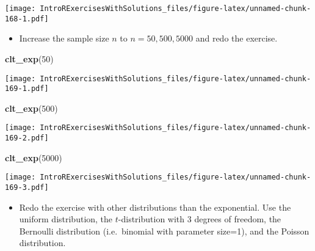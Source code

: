 \documentclass[]{article}
\newenvironment{Shaded}{\begin{snugshade}}{\end{snugshade}}
\newcommand{\KeywordTok}[1]{\textcolor[rgb]{0.13,0.29,0.53}{\textbf{#1}}}
\newcommand{\DecValTok}[1]{\textcolor[rgb]{0.00,0.00,0.81}{#1}}
\newcommand{\NormalTok}[1]{#1}
\providecommand{\tightlist}{%
  \setlength{\itemsep}{0pt}\setlength{\parskip}{0pt}}
\begin{document}
\texttt{[image: IntroRExercisesWithSolutions\_files/figure-latex/unnamed-chunk-168-1.pdf]}

\begin{itemize}
\tightlist
\item
  Increase the sample size \(n\) to \(n=50,500,5000\) and redo the
  exercise.
\end{itemize}

\begin{Shaded}
\begin{Highlighting}[]
\KeywordTok{clt_exp}\NormalTok{(}\DecValTok{50}\NormalTok{)}
\end{Highlighting}
\end{Shaded}

\texttt{[image: IntroRExercisesWithSolutions\_files/figure-latex/unnamed-chunk-169-1.pdf]}

\begin{Shaded}
\begin{Highlighting}[]
\KeywordTok{clt_exp}\NormalTok{(}\DecValTok{500}\NormalTok{)}
\end{Highlighting}
\end{Shaded}

\texttt{[image: IntroRExercisesWithSolutions\_files/figure-latex/unnamed-chunk-169-2.pdf]}

\begin{Shaded}
\begin{Highlighting}[]
\KeywordTok{clt_exp}\NormalTok{(}\DecValTok{5000}\NormalTok{)}
\end{Highlighting}
\end{Shaded}

\texttt{[image: IntroRExercisesWithSolutions\_files/figure-latex/unnamed-chunk-169-3.pdf]}

\begin{itemize}
\tightlist
\item
  Redo the exercise with other distributions than the exponential. Use
  the uniform distribution, the \(t\)-distribution with 3 degrees of
  freedom, the Bernoulli distribution (i.e.~binomial with parameter
  size=1), and the Poisson distribution.
\end{itemize}
\end{document}
